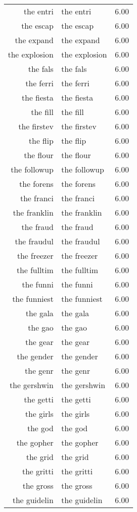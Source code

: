 \begin{table}[ht]
\begin{tabular}{rlr}
  the entri & the entri & 6.00 \\ 
  the escap & the escap & 6.00 \\ 
  the expand & the expand & 6.00 \\ 
  the explosion & the explosion & 6.00 \\ 
  the fals & the fals & 6.00 \\ 
  the ferri & the ferri & 6.00 \\ 
  the fiesta & the fiesta & 6.00 \\ 
  the fill & the fill & 6.00 \\ 
  the firstev & the firstev & 6.00 \\ 
  the flip & the flip & 6.00 \\ 
  the flour & the flour & 6.00 \\ 
  the followup & the followup & 6.00 \\ 
  the forens & the forens & 6.00 \\ 
  the franci & the franci & 6.00 \\ 
  the franklin & the franklin & 6.00 \\ 
  the fraud & the fraud & 6.00 \\ 
  the fraudul & the fraudul & 6.00 \\ 
  the freezer & the freezer & 6.00 \\ 
  the fulltim & the fulltim & 6.00 \\ 
  the funni & the funni & 6.00 \\ 
  the funniest & the funniest & 6.00 \\ 
  the gala & the gala & 6.00 \\ 
  the gao & the gao & 6.00 \\ 
  the gear & the gear & 6.00 \\ 
  the gender & the gender & 6.00 \\ 
  the genr & the genr & 6.00 \\ 
  the gershwin & the gershwin & 6.00 \\ 
  the getti & the getti & 6.00 \\ 
  the girls & the girls & 6.00 \\ 
  the god & the god & 6.00 \\ 
  the gopher & the gopher & 6.00 \\ 
  the grid & the grid & 6.00 \\ 
  the gritti & the gritti & 6.00 \\ 
  the gross & the gross & 6.00 \\ 
  the guidelin & the guidelin & 6.00 \\ 

\end{tabular}
\end{table}
